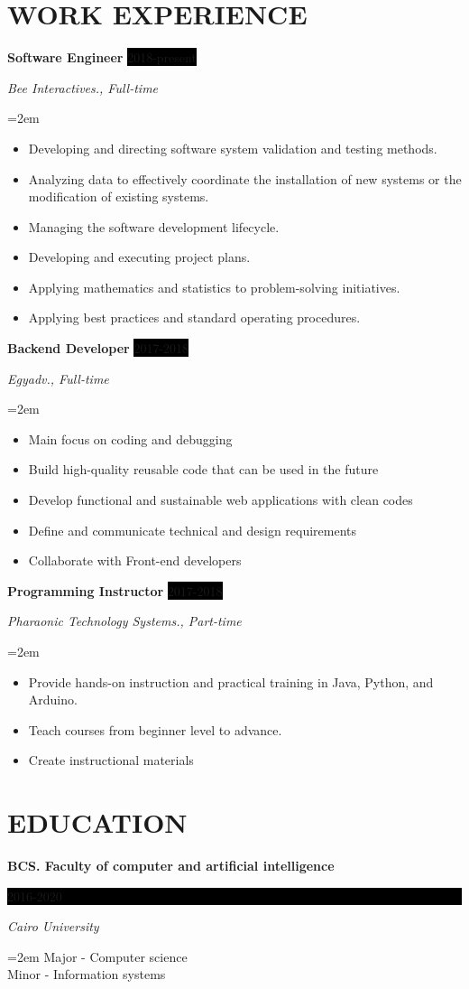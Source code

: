 \documentclass[paper=a4,fontsize=11pt]{scrartcl} %
\newcommand{\sepspace}{\vspace*{1em}}		%
\newcommand{\NewPart}[1]{\section*{\uppercase{#1}}}
\newcommand{\EducationEntry}[4]{
		\noindent \textbf{#1} \hfill      %
		\colorbox{Black}{%
			\parbox{6em}{%
			\hfill\color{White}#2}} \par  %
		\noindent \textit{#3} \par        %
		\noindent\hangindent=2em\hangafter=0 \small #4 %
		\normalsize \par}
\newcommand{\WorkEntry}[4]{				  %
		\noindent \textbf{#1} \hfill      %
		\colorbox{Black}{\color{White}#2} \par  %
		\noindent \textit{#3} \par              %
		\noindent\hangindent=2em\hangafter=0 \small #4 %
		\normalsize \par}
\begin{document}
\NewPart{Work experience}{

\WorkEntry{Software Engineer}{2018-present}{Bee Interactives., Full-time}{
\begin{itemize}
\item Developing and directing software system validation and testing methods.
\item Analyzing data to effectively coordinate the installation of new systems or the modification of existing systems.
\item Managing the software development lifecycle.
\item Developing and executing project plans.
\item Applying mathematics and statistics to problem-solving initiatives.
\item Applying best practices and standard operating procedures.
\end{itemize}
}


\WorkEntry{Backend Developer}{2017-2018}{Egyadv., Full-time}{
\begin{itemize}
\item Main focus on coding and debugging
\item Build high-quality reusable code that can be used in the future
\item Develop functional and sustainable web applications with clean codes
\item Define and communicate technical and design requirements
\item Collaborate with Front-end developers 
\end{itemize}
}

\sepspace
\WorkEntry{Programming Instructor}{2017-2018}{Pharaonic Technology Systems., Part-time}{
\begin{itemize}
\item Provide hands-on instruction and practical training in Java, Python, and Arduino.
\item Teach courses from beginner level to advance.
\item Create instructional materials
\end{itemize}
}

}

\NewPart{Education}{}

\EducationEntry{BCS. Faculty of computer and artificial intelligence}{2016-2020}{Cairo
  University}{Major - Computer science \\ Minor - Information systems}
\sepspace
\end{document}
